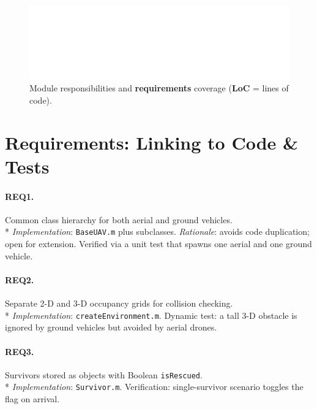 \documentclass[12pt,a4paper]{report}
\begin{document}
\begin{figure}[H]
  \centering
  \includegraphics[width=\textwidth]{figures/table_modules}
  \caption{Module responsibilities and \textbf{requirements} coverage
           (\textbf{LoC} = lines of code).}
  \label{fig:moduleResponsibility}
\end{figure}

\section{Requirements: Linking to Code \& Tests}
\label{sec:reqs_link}

\paragraph{REQ1.} Common class hierarchy for both aerial and ground vehicles.\\*
\emph{Implementation}: \texttt{BaseUAV.m} plus subclasses.  
\emph{Rationale}: avoids code duplication; open for extension.  
Verified via a unit test that spawns one aerial and one ground vehicle.

\paragraph{REQ2.} Separate 2-D and 3-D occupancy grids for collision checking.\\*
\emph{Implementation}: \texttt{createEnvironment.m}.  
Dynamic test: a tall 3-D obstacle is ignored by ground vehicles but avoided by aerial drones.

\paragraph{REQ3.} Survivors stored as objects with Boolean \texttt{isRescued}.\\*
\emph{Implementation}: \texttt{Survivor.m}.  
Verification: single-survivor scenario toggles the flag on arrival.
\end{document}
